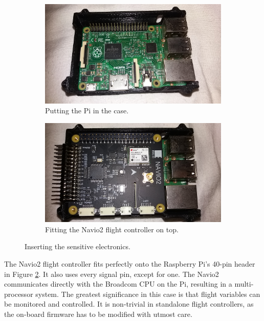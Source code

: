 \begin{figure}[H]
\begin{subfigure}{0.5\textwidth}
\centering
\includegraphics[scale=0.1]{images/drone-build-3dcase-pi.jpg}
\caption{Putting the Pi in the case.}
\label{fig:insertion_pi}
\end{subfigure}
\begin{subfigure}{0.5\textwidth}
\centering
\includegraphics[scale=0.1]{images/drone-build-3dcase-pi-navio.jpg}
\caption{Fitting the Navio2 flight controller on top.}
\label{fig:insertion_navio}
\end{subfigure}
\caption{Inserting the sensitive electronics.}
\label{fig:insertion}
\end{figure}

\noindent
The Navio2 flight controller fits perfectly onto the Raspberry Pi's 40-pin header in Figure \ref{fig:insertion_navio}. It also uses every signal pin, except for one. The Navio2 communicates directly with the Broadcom CPU on the Pi, resulting in a multi-processor system. The greatest significance in this case is that flight variables can be monitored and controlled. It is non-trivial in standalone flight controllers, as the on-board firmware has to be modified with utmost care.

